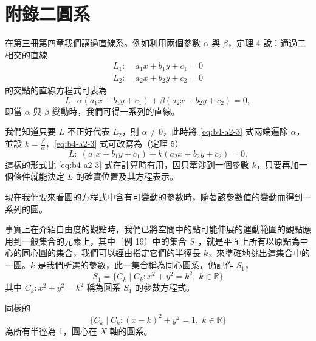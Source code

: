 
\section*{附錄二\quad 圓系}
\setcounter{prop}{0}
\label{sec:b4-a2}

在第三冊第四章我們講過直線系。例如利用兩個參數 $\alpha$ 與 $\beta$，定理 4 說：通過二相交的直線
\begin{align}
L_1:&\; a_1 x + b_1 y + c_1 = 0 \label{eq:b4-a2-1} \\
L_2:&\; a_2 x + b_2 y + c_2 = 0 \label{eq:b4-a2-2}
\end{align}
的交點的直線方程式可表為
\begin{equation}
L:\; \alpha(a_1 x + b_1 y + c_1) + \beta(a_2 x + b_2 y + c_2) = 0, \label{eq:b4-a2-3}
\end{equation}
即當 $\alpha$ 與 $\beta$ 變動時，我們可得一系列的直線。

我們知道只要 $L$ 不正好代表 $L_2$，則 $\alpha \neq 0$，此時將 \eqref{eq:b4-a2-3} 式兩端遍除 $\alpha$，並設 $k = \frac{\beta}{\alpha}$，\eqref{eq:b4-a2-3} 式可改寫為（定理 5）
\[
L:\; (a_1 x + b_1 y + c_1) + k(a_2 x + b_2 y + c_2) = 0.
\]
這樣的形式比 \eqref{eq:b4-a2-3} 式在計算時有用，因只牽涉到一個參數 $k$，只要再加一個條件就能決定 $L$ 的確實位置及其方程表示。

現在我們要來看圓的方程式中含有可變動的參數時，隨著該參數值的變動而得到一系列的圓。

事實上在介紹自由度的觀點時，我們已將空間中的點可能伸展的運動範圍的觀點應用到一般集合的元素上，其中〔例 19〕中的集合 $S_1$，就是平面上所有以原點為中心的同心圓的集合，我們可以經由指定它們的半徑長 $k$，來準確地挑出這集合中的一圓。$k$ 是我們所選的參數，此一集合稱為同心圓系，仍記作 $S_1$，
\[
S_1 = \{C_k \mid C_k: x^2+y^2=k^2, \; k \in \mathbb{R}\}
\]
其中 $C_k: x^2+y^2=k^2$ 稱為圓系 $S_1$ 的參數方程式。

同樣的
\[
\{C_k \mid C_k: (x-k)^2+y^2=1, \; k \in \mathbb{R}\}
\]
為所有半徑為 1，圓心在 $X$ 軸的圓系。

\begin{center}
\end{center}

